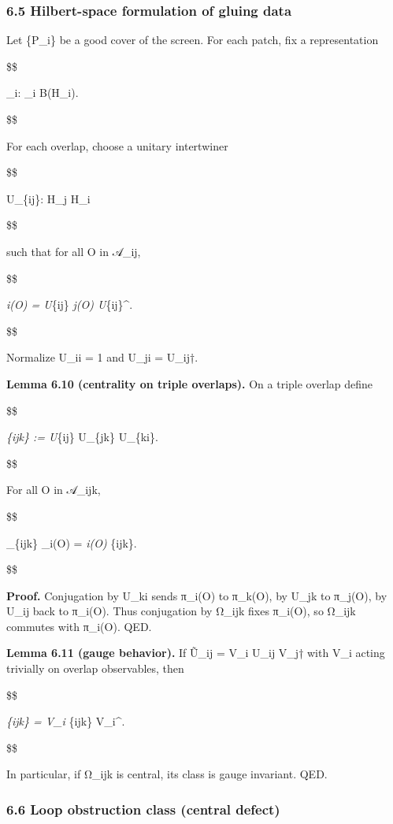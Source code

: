 \documentclass[11pt,a4paper]{article}
\theoremstyle{remark}
\begin{document}
\subsubsection{6.5 Hilbert-space formulation of gluing data}\label{hilbert-space-formulation-of-gluing-data}

Let \{P\_i\} be a good cover of the screen. For each patch, fix a representation

\$\$

\pi\_i: \_i \to \mathcal B(\mathcal H\_i).

\$\$

For each overlap, choose a unitary intertwiner

\$\$

U\_\{ij\}: \mathcal H\_j \to \mathcal H\_i

\$\$

such that for all O in 𝒜\_ij,

\$\$

\pi\emph{i(O) = U}\{ij\} \pi\emph{j(O) U}\{ij\}\^{}\dagger.

\$\$

Normalize U\_ii = 1 and U\_ji = U\_ij†.

\textbf{Lemma 6.10 (centrality on triple overlaps).} On a triple overlap define

\$\$

\Omega\emph{\{ijk\} := U}\{ij\} U\_\{jk\} U\_\{ki\}.

\$\$

For all O in 𝒜\_ijk,

\$\$

\Omega\_\{ijk\} \pi\_i(O) = \pi\emph{i(O) \Omega}\{ijk\}.

\$\$

\textbf{Proof.} Conjugation by U\_ki sends π\_i(O) to π\_k(O), by U\_jk to π\_j(O),
by U\_ij back to π\_i(O). Thus conjugation by Ω\_ijk fixes π\_i(O), so
Ω\_ijk commutes with π\_i(O). QED.

\textbf{Lemma 6.11 (gauge behavior).} If Ũ\_ij = V\_i U\_ij V\_j† with V\_i
acting trivially on overlap observables, then

\$\$

\tilde{\Omega}\emph{\{ijk\} = V\_i \Omega}\{ijk\} V\_i\^{}\dagger.

\$\$

In particular, if Ω\_ijk is central, its class is gauge invariant. QED.

\subsubsection{6.6 Loop obstruction class (central defect)}\label{loop-obstruction-class-central-defect-1}
\end{document}
